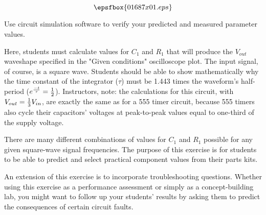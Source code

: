 

$$\epsfbox{01687x01.eps}$$

\vfil \eject






Use circuit simulation software to verify your predicted and measured parameter values.







Here, students must calculate values for $C_1$ and $R_1$ that will produce the $V_{out}$ waveshape specified in the "Given conditions" oscilloscope plot.  The input signal, of course, is a square wave.  Students should be able to show mathematically why the time constant of the integrator ($\tau$) must be 1.443 times the waveform's half-period ($e^{-t \over \tau} = {1 \over 2}$).  Instructors, note: the calculations for this circuit, with $V_{out} = {1 \over 3}V_{in}$, are exactly the same as for a 555 timer circuit, because 555 timers also cycle their capacitors' voltages at peak-to-peak values equal to one-third of the supply voltage.

There are many different combinations of values for $C_1$ and $R_1$ possible for any given square-wave signal frequencies.  The purpose of this exercise is for students to be able to predict and select practical component values from their parts kits.

An extension of this exercise is to incorporate troubleshooting questions.  Whether using this exercise as a performance assessment or simply as a concept-building lab, you might want to follow up your students' results by asking them to predict the consequences of certain circuit faults.




